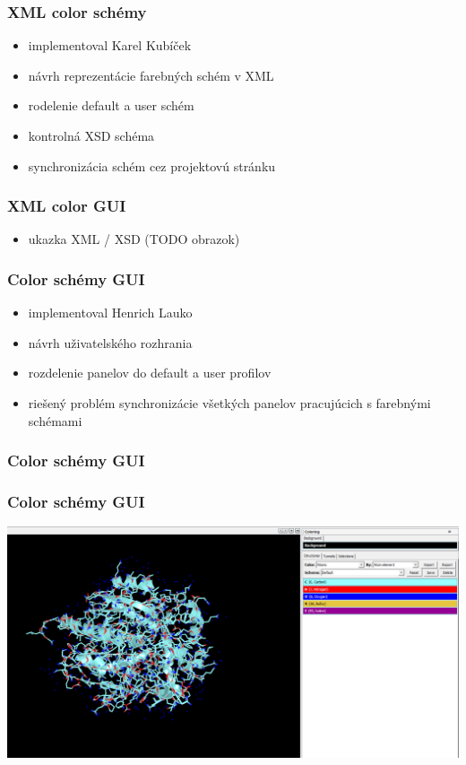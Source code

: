 \documentclass[slovak]{beamer}
\begin{document}
\begin{frame}
\frametitle{XML color schémy}
	\begin{itemize}
		\item implementoval Karel Kubíček
		\item návrh reprezentácie farebných schém v XML
		\item rodelenie default a user schém
		\item kontrolná XSD schéma
		\item synchronizácia schém cez projektovú stránku
	\end{itemize}
\end{frame}

\begin{frame}
\frametitle{XML color GUI}
	\begin{itemize}
		\item ukazka XML / XSD (TODO obrazok)
	\end{itemize}
\end{frame}

\begin{frame}
\frametitle{Color schémy GUI}
	\begin{itemize}
		\item implementoval Henrich Lauko
		\item návrh uživatelského rozhrania
		\item rozdelenie panelov do default a user profilov
		\item riešený problém synchronizácie všetkých panelov pracujúcich s farebnými schémami
	\end{itemize}
\end{frame}

\begin{frame}
\frametitle{Color schémy GUI}
	\frametitle{Color schémy GUI}
	\includegraphics[width=\linewidth]{colorpanel.jpg}
\end{frame}
\end{document}
